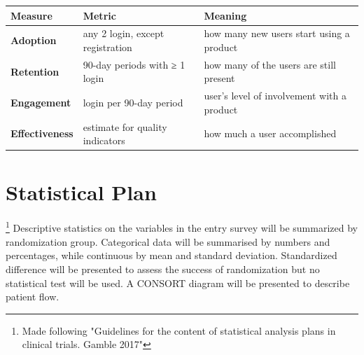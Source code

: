 \begingroup
\setlength{\tabcolsep}{8pt} %
\renewcommand{\arraystretch}{1.5} %
\small
\begin{table}[h!]
\begin{tabular}{l|l|l}
\textbf{Measure}       & \textbf{Metric}                  & \textbf{Meaning}                           \\
\hline                                                                                                    
\textbf{Adoption}      & any 2 login, except registration & how many new users start using a product   \\
\textbf{Retention}     & 90-day periods with ≥ 1 login    & how many of the users are still present    \\
\textbf{Engagement}    & login per 90-day period          & user’s level of involvement with a product \\
\textbf{Effectiveness} & estimate for quality indicators  & how much a user accomplished                                       
\end{tabular}
\end{table}
\endgroup

\section{Statistical Plan}\footnote{Made following "Guidelines for the content of statistical analysis plans in clinical trials. Gamble 2017"}
Descriptive statistics on the variables in the entry survey will be summarized by randomization group. Categorical data will be summarised by numbers and percentages, while continuous by mean and standard deviation. Standardized difference will be presented to assess the success of randomization but no statistical test will be used. A CONSORT diagram will be presented to describe patient flow.

